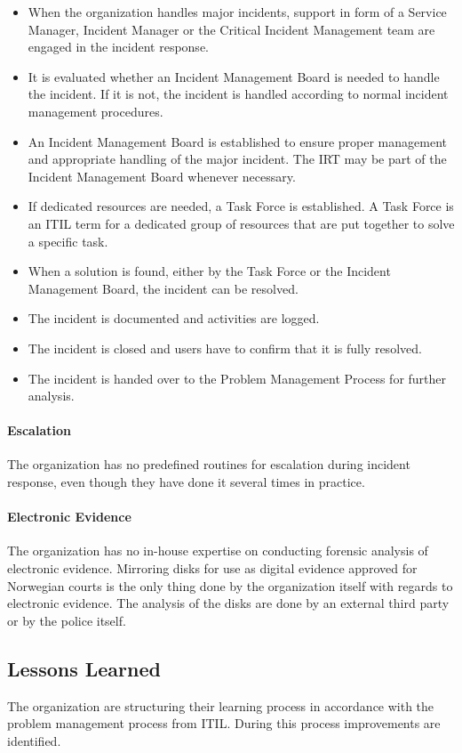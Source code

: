 \begin{itemize}
\item When the organization handles major incidents, support in form of a Service Manager, Incident Manager or the Critical Incident Management team are engaged in the incident response.
\item It is evaluated whether an Incident Management Board is needed to handle the incident. If it is not, the incident is handled according to normal incident management procedures.
\item An Incident Management Board is established to ensure proper management and appropriate handling of the major incident. The \ac{IRT} may be part of the Incident Management Board whenever necessary.
\item If dedicated resources are needed, a Task Force is established. A Task Force is an ITIL term for a dedicated group of resources that are put together to solve a specific task.
\item When a solution is found, either by the Task Force or the Incident Management Board, the incident can be resolved.
\item The incident is documented and activities are logged.
\item The incident is closed and users have to confirm that it is fully resolved.
\item The incident is handed over to the Problem Management Process for further analysis.  
\end{itemize}


\paragraph{Escalation}
The organization has no predefined routines for escalation during incident response, even though they have done it several times in practice.

\paragraph{Electronic Evidence}
The organization has no in-house expertise on conducting forensic analysis of electronic evidence. Mirroring disks for use as digital evidence approved for Norwegian courts is the only thing done by the organization itself with regards to electronic evidence. The analysis of the disks are done by an external third party or by the police itself.

\subsection{Lessons Learned}
The organization are structuring their learning process in accordance with the problem management process from ITIL. During this process improvements are identified. 

